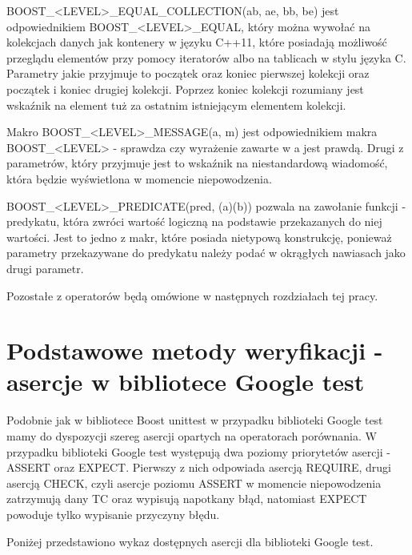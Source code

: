 \documentclass[12pt,a4paper,notitlepage]{report}
\begin{document}
BOOST{\_}<LEVEL>{\_}EQUAL{\_}COLLECTION(ab, ae, bb, be) jest odpowiednikiem BOOST{\_}<LEVEL>{\_}EQUAL, który można wywołać na kolekcjach danych jak kontenery w języku C++11, które posiadają możliwość przeglądu elementów przy pomocy iteratorów albo na tablicach w stylu języka C. Parametry jakie przyjmuje to początek oraz koniec pierwszej kolekcji oraz początek i koniec drugiej kolekcji. Poprzez koniec kolekcji rozumiany jest wskaźnik na element tuż za ostatnim istniejącym elementem kolekcji.

Makro BOOST{\_}<LEVEL>{\_}MESSAGE(a, m) jest odpowiednikiem makra BOOST{\_}<LEVEL> - sprawdza czy wyrażenie zawarte w a jest prawdą. Drugi z parametrów, który przyjmuje jest to wskaźnik na niestandardową wiadomość, która będzie wyświetlona w momencie niepowodzenia.

BOOST{\_}<LEVEL>{\_}PREDICATE(pred, (a)(b)) pozwala na zawołanie funkcji - predykatu, która zwróci wartość logiczną na podstawie przekazanych do niej wartości. Jest to jedno z makr, które posiada nietypową konstrukcję, ponieważ parametry przekazywane do predykatu należy podać w okrągłych nawiasach jako drugi parametr.

Pozostałe z operatorów będą omówione w następnych rozdziałach tej pracy.

			

\section{Podstawowe metody weryfikacji - asercje w bibliotece Google test}

Podobnie jak w bibliotece Boost unittest w przypadku biblioteki Google test mamy do dyspozycji szereg asercji opartych na operatorach porównania. W przypadku biblioteki Google test występują dwa poziomy priorytetów asercji - ASSERT oraz EXPECT. Pierwszy z nich odpowiada asercją REQUIRE, drugi asercją CHECK, czyli asercje poziomu ASSERT w momencie niepowodzenia zatrzymują dany TC oraz wypisują napotkany błąd, natomiast EXPECT powoduje tylko wypisanie przyczyny błędu.

Poniżej przedstawiono wykaz dostępnych asercji dla biblioteki Google test.
\end{document}
